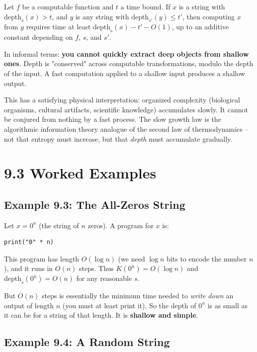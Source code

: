 \begin{theorem}
Let $f$ be a computable function and $t$ a time bound. If $x$ is a string with $\text{depth}_s(x) > t$, and $y$ is any string with $\text{depth}_{s'}(y) \leq t'$, then computing $x$ from $y$ requires time at least $\text{depth}_s(x) - t' - O(1)$, up to an additive constant depending on $f$, $s$, and $s'$.

In informal terms: \textbf{you cannot quickly extract deep objects from shallow ones}. Depth is "conserved" across computable transformations, modulo the depth of the input. A fast computation applied to a shallow input produces a shallow output.

This has a satisfying physical interpretation: organized complexity (biological organisms, cultural artifacts, scientific knowledge) accumulates slowly. It cannot be conjured from nothing by a fast process. The slow growth law is the algorithmic information theory analogue of the second law of thermodynamics -- not that entropy must increase, but that \textit{depth} must accumulate gradually.
\end{theorem}

\section{9.3 Worked Examples}

\subsection{Example 9.3: The All-Zeros String}

Let $x = 0^n$ (the string of $n$ zeros). A program for $x$ is:

\begin{lstlisting}
print("0" * n)
\end{lstlisting}

This program has length $O(\log n)$ (we need $\log n$ bits to encode the number $n$), and it runs in $O(n)$ steps. Thus $K(0^n) = O(\log n)$ and $\text{depth}_s(0^n) = O(n)$ for any reasonable $s$.

But $O(n)$ steps is essentially the minimum time needed to \textit{write down} an output of length $n$ (you must at least print it). So the depth of $0^n$ is as small as it can be for a string of that length. It is \textbf{shallow and simple}.

\subsection{Example 9.4: A Random String}

